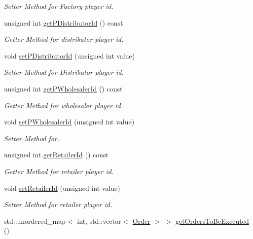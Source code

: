 \begin{DoxyCompactItemize}
\begin{DoxyCompactList}\small\item\em Setter Method for Factory player id. \end{DoxyCompactList}\item 
unsigned int \hyperlink{classGame_a55ce7f3ec72183e839c3139db478e367}{get\+P\+Distributor\+Id} () const
\begin{DoxyCompactList}\small\item\em Getter Method for distributor player id. \end{DoxyCompactList}\item 
void \hyperlink{classGame_ab88440f7297899b9e534f314f5f49eaa}{set\+P\+Distributor\+Id} (unsigned int value)
\begin{DoxyCompactList}\small\item\em Setter Method for Distributor player id. \end{DoxyCompactList}\item 
unsigned int \hyperlink{classGame_a8197219d0ce49f5ac76d1ed6890cfb3e}{get\+P\+Wholesaler\+Id} () const
\begin{DoxyCompactList}\small\item\em Getter Method for wholesaler player id. \end{DoxyCompactList}\item 
void \hyperlink{classGame_ae192d77627e937d9840f77126fc0b3b7}{set\+P\+Wholesaler\+Id} (unsigned int value)
\begin{DoxyCompactList}\small\item\em Setter Method for. \end{DoxyCompactList}\item 
unsigned int \hyperlink{classGame_a22a98a8e7701f22e9bf5c1c011724154}{get\+Retailer\+Id} () const
\begin{DoxyCompactList}\small\item\em Getter Method for retailer player id. \end{DoxyCompactList}\item 
void \hyperlink{classGame_a676c213e382f1b539ac0a3fc56d8d744}{set\+Retailer\+Id} (unsigned int value)
\begin{DoxyCompactList}\small\item\em Setter Method for retailer player id. \end{DoxyCompactList}\item 
std\+::unordered\+\_\+map$<$ int, std\+::vector$<$ \hyperlink{classOrder}{Order} $>$ $>$ \hyperlink{classGame_aaeec900986f34b81e46c369b2ceb0443}{get\+Orders\+To\+Be\+Executed} ()

\end{DoxyCompactItemize}
